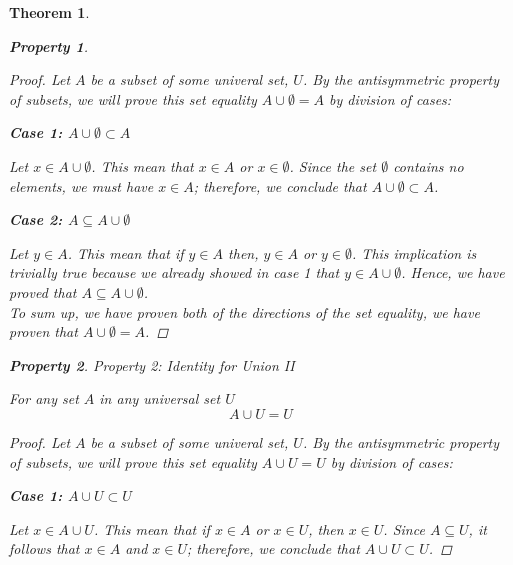 \documentclass{book}
\newtheorem{theorem}{Theorem}[section]
\newtheorem{property}{Property}[theorem]
\theoremstyle{definition}
\theoremstyle{remark}
\begin{document}
\begin{theorem}
\begin{property}
        \begin{proof}
            Let $A$ be a subset of some univeral set, $U$. By the antisymmetric property of subsets, we will prove this set equality $A \cup \emptyset = A$ by division of cases:
            
            \begin{flushleft} \textbf{Case 1: $A \cup \emptyset \subset A$} \end{flushleft}
                Let $x \in A \cup \emptyset $. This mean that $x \in A$ or $x \in \emptyset$. Since the set $\emptyset$ contains no elements, we must have $x \in A$; therefore, we conclude that $A \cup \emptyset \subset A$.
            
            \begin{flushleft} \textbf{Case 2: $A \subseteq A \cup \emptyset$} \end{flushleft} 
                Let $y \in A$. This mean that if  $y \in A$ then, $y \in A$ or $y \in \emptyset$. This implication  is trivially true because we already showed in \textit{case 1} that $y \in A \cup \emptyset$. Hence, we have proved that $A \subseteq A \cup \emptyset$. \\
            
            To sum up, we have proven both of the directions of the set equality, we have proven that $A \cup \emptyset = A$. 
        \end{proof}
    \end{property}
    
    
    
    \begin{property}
    Property 2: Identity for Union II \\
        \begin{tcolorbox}
            For any set $A$ in any universal set $U$
                \begin{equation*}
                    A \cup U = U
                \end{equation*}
        \end{tcolorbox}
    
        \begin{proof}
            Let $A$ be a subset of some univeral set, $U$. By the antisymmetric property of subsets, we will prove this set equality $A \cup U = U$ by division of cases:
            
            \begin{flushleft} \textbf{Case 1: $A \cup U \subset U$} \end{flushleft}
                Let $x \in A \cup U $. This mean that if $x \in A$ or $x \in U$, then $x \in U$. Since $A \subseteq U$, it follows that $x \in A$ and $x \in U$; therefore, we conclude that $A \cup U \subset U$.
            

\end{proof}
\end{property}
\end{theorem}
\end{document}
